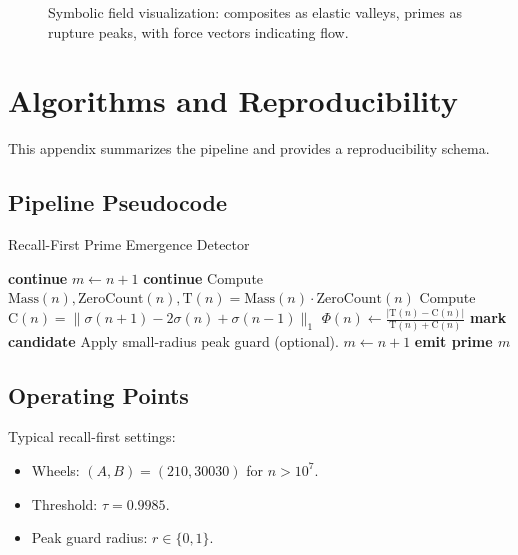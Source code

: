 \documentclass[11pt]{article}
\theoremstyle{plain}
\theoremstyle{definition}
\newcommand{\mass}{\mathrm{Mass}}                            %
\newcommand{\zcount}{\mathrm{ZeroCount}}                    %
\newcommand{\tension}{\mathrm{T}}                           %
\newcommand{\curv}{\mathrm{C}}                              %
\newcommand{\phidet}{\Phi}                                  %
\begin{document}
\begin{figure}[h!]
  \centering
  \caption{Symbolic field visualization: composites as elastic valleys, primes as rupture peaks, with force vectors indicating flow.}
  \label{fig:symbolic-field}
\end{figure}

\section{Algorithms and Reproducibility}\label{app:alg}

This appendix summarizes the pipeline and provides a reproducibility schema.

\subsection*{Pipeline Pseudocode}
\begin{algorithm}[h!]
\caption{Recall-First Prime Emergence Detector}
\begin{algorithmic}[1]
   \textbf{continue}  \EndIf
  \State $m \gets n+1$
   \textbf{continue}  \EndIf
  \State Compute $\mass(n), \zcount(n), \tension(n) = \mass(n)\cdot\zcount(n)$
  \State Compute $\curv(n) = \|\sigma(n+1) - 2\sigma(n) + \sigma(n-1)\|_1$
  \State $\phidet(n) \gets \frac{|\tension(n)-\curv(n)|}{\tension(n)+\curv(n)}$
  \If{$\phidet(n) > \tau$} \textbf{mark candidate} \EndIf
\EndFor
\State Apply small-radius peak guard (optional).
  \State $m \gets n+1$
   \textbf{emit prime $m$}  \EndIf
\EndFor
\end{algorithmic}
\end{algorithm}

\subsection*{Operating Points}
Typical recall-first settings:
\begin{itemize}
  \item Wheels: $(A,B) = (210,30030)$ for $n > 10^7$.  
  \item Threshold: $\tau = 0.9985$.  
  \item Peak guard radius: $r \in \{0,1\}$.  
\end{itemize}
\end{document}
